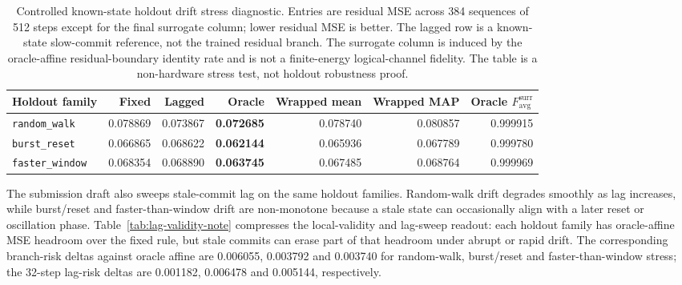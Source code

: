 \documentclass[11pt]{article}
\begin{document}
\begin{table}[ht]
\centering
\scriptsize
\setlength{\tabcolsep}{2.5pt}
\begin{tabular}{lrrrrrr}
\toprule
Holdout family & Fixed & Lagged & Oracle & Wrapped mean & Wrapped MAP & Oracle \(F_{\mathrm{avg}}^{\mathrm{surr}}\) \\
\midrule
\texttt{random\_walk} & 0.078869 & 0.073867 & \textbf{0.072685} & 0.078740 & 0.080857 & 0.999915 \\
\texttt{burst\_reset} & 0.066865 & 0.068622 & \textbf{0.062144} & 0.065936 & 0.067789 & 0.999780 \\
\texttt{faster\_window} & 0.068354 & 0.068890 & \textbf{0.063745} & 0.067485 & 0.068764 & 0.999969 \\
\bottomrule
\end{tabular}
\caption{Controlled known-state holdout drift stress diagnostic.  Entries are
residual MSE across 384 sequences of 512 steps except for the final surrogate
column; lower residual MSE is better.  The lagged row is a known-state
slow-commit reference, not the trained residual branch.  The surrogate column
is induced by the oracle-affine residual-boundary identity rate and is not a
finite-energy logical-channel fidelity.  The table is a non-hardware stress
test, not holdout robustness proof.}
\label{tab:holdout-stress-note}
\end{table}

The submission draft also sweeps stale-commit lag on the same holdout
families.  Random-walk drift degrades smoothly as lag increases, while
burst/reset and faster-than-window drift are non-monotone because a stale
state can occasionally align with a later reset or oscillation phase.
Table~\ref{tab:lag-validity-note} compresses the local-validity and lag-sweep
readout: each holdout family has oracle-affine MSE headroom over the fixed
rule, but stale commits can erase part of that headroom under abrupt or rapid
drift.  The corresponding branch-risk deltas against oracle affine are
0.006055, 0.003792 and 0.003740 for random-walk, burst/reset and
faster-than-window stress; the 32-step lag-risk deltas are 0.001182, 0.006478
and 0.005144, respectively.
\end{document}
